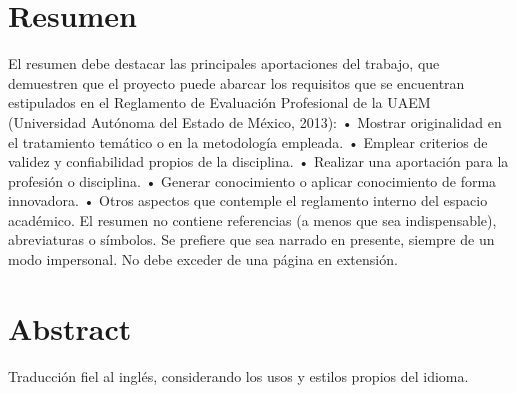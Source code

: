 \chapter*{Resumen}

El resumen debe destacar las principales aportaciones del trabajo, que demuestren que el
proyecto puede abarcar los requisitos que se encuentran estipulados en el Reglamento de
Evaluación Profesional de la UAEM (Universidad Autónoma del Estado de México, 2013):
• Mostrar originalidad en el tratamiento temático o en la metodología empleada.
• Emplear criterios de validez y confiabilidad propios de la disciplina.
• Realizar una aportación para la profesión o disciplina.
• Generar conocimiento o aplicar conocimiento de forma innovadora.
• Otros aspectos que contemple el reglamento interno del espacio académico.
El resumen no contiene referencias (a menos que sea indispensable), abreviaturas o
símbolos. Se prefiere que sea narrado en presente, siempre de un modo impersonal. No
debe exceder de una página en extensión. 

\chapter*{Abstract}

Traducción fiel al inglés, considerando los usos y estilos propios del idioma. 